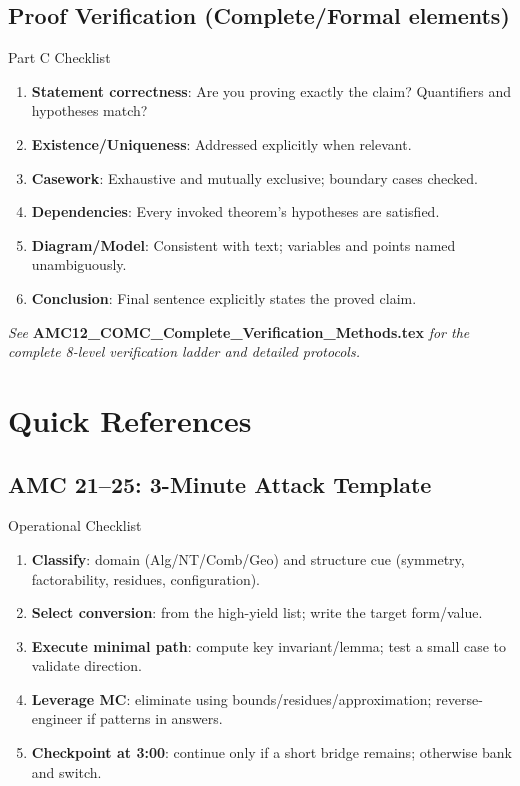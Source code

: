 \documentclass{article}
\begin{document}
\subsection{Proof Verification (Complete/Formal elements)}
\begin{completebox}{Part C Checklist}
\begin{enumerate}
    \item \textbf{Statement correctness}: Are you proving exactly the claim? Quantifiers and hypotheses match?
    \item \textbf{Existence/Uniqueness}: Addressed explicitly when relevant.
    \item \textbf{Casework}: Exhaustive and mutually exclusive; boundary cases checked.
    \item \textbf{Dependencies}: Every invoked theorem’s hypotheses are satisfied.
    \item \textbf{Diagram/Model}: Consistent with text; variables and points named unambiguously.
    \item \textbf{Conclusion}: Final sentence explicitly states the proved claim.
\end{enumerate}
\emph{See} \textbf{AMC12\_COMC\_Complete\_Verification\_Methods.tex} \emph{for the complete 8-level verification ladder and detailed protocols.}
\end{completebox}

\newpage

\section{Quick References}

\subsection{AMC 21--25: 3-Minute Attack Template}
\begin{standardbox}{Operational Checklist}
\begin{enumerate}[nosep]
    \item \textbf{Classify}: domain (Alg/NT/Comb/Geo) and structure cue (symmetry, factorability, residues, configuration).
    \item \textbf{Select conversion}: from the high-yield list; write the target form/value.
    \item \textbf{Execute minimal path}: compute key invariant/lemma; test a small case to validate direction.
    \item \textbf{Leverage MC}: eliminate using bounds/residues/approximation; reverse-engineer if patterns in answers.
    \item \textbf{Checkpoint at 3:00}: continue only if a short bridge remains; otherwise bank and switch.
\end{enumerate}
\end{standardbox}
\end{document}
